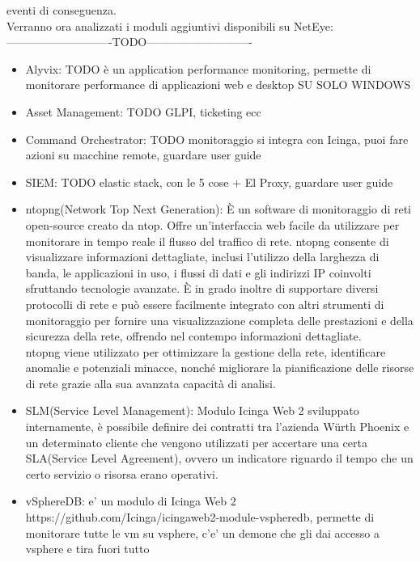 eventi di conseguenza.\\ Verranno ora analizzati i moduli aggiuntivi disponibili
su NetEye: \\----------------------------TODO----------------------------
\begin{itemize}
  \item Alyvix: TODO è un application performance monitoring, permette di monitorare
    performance di applicazioni web e desktop SU SOLO WINDOWS

  \item Asset Management: TODO GLPI, ticketing ecc

  \item Command Orchestrator: TODO monitoraggio si integra con Icinga, puoi fare
    azioni su macchine remote, guardare user guide

  \item SIEM: TODO elastic stack, con le 5 cose + El Proxy, guardare user guide

  \item ntopng(Network Top Next Generation): È un software di monitoraggio di reti
    open-source creato da ntop. Offre un'interfaccia web facile da utilizzare
    per monitorare in tempo reale il flusso del traffico di rete. ntopng consente
    di visualizzare informazioni dettagliate, inclusi l'utilizzo della larghezza
    di banda, le applicazioni in uso, i flussi di dati e gli indirizzi IP
    coinvolti sfruttando tecnologie avanzate. È in grado inoltre di supportare diversi
    protocolli di rete e può essere facilmente integrato con altri strumenti di monitoraggio
    per fornire una visualizzazione completa delle prestazioni e della sicurezza
    della rete, offrendo nel contempo informazioni dettagliate.\\ ntopng viene
    utilizzato per ottimizzare la gestione della rete, identificare anomalie e potenziali
    minacce, nonché migliorare la pianificazione delle risorse di rete grazie
    alla sua avanzata capacità di analisi.

  \item SLM(Service Level Management): Modulo Icinga Web 2 sviluppato internamente,
    è possibile definire dei contratti tra l'azienda Würth Phoenix e un
    determinato cliente che vengono utilizzati per accertare una certa SLA(Service
    Level Agreement), ovvero un indicatore riguardo il tempo che un certo
    servizio o risorsa erano operativi.

  \item vSphereDB: e' un modulo di Icinga Web 2 https://github.com/Icinga/icingaweb2-module-vspheredb,
    permette di monitorare tutte le vm su vsphere, c'e' un demone che gli dai
    accesso a vsphere e tira fuori tutto
\end{itemize}
